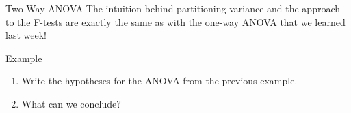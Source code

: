 \begin{frame}{Two-Way ANOVA}
    The intuition behind partitioning variance and the approach to the F-tests are exactly the same as with the one-way ANOVA that we learned last week!
\end{frame}

\begin{frame}{Example}
    \begin{enumerate}
        \item Write the hypotheses for the ANOVA from the previous example.
        \item What can we conclude?
    \end{enumerate}
\end{frame}
